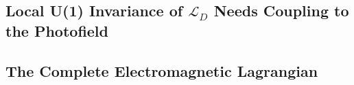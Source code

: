 \documentclass[12pt]{article}
\begin{document}
\subsection{Local U(1) Invariance of $\mathcal{L}_D$ Needs Coupling to the Photofield}

\subsection{The Complete Electromagnetic Lagrangian}

\begin{center}
\end{center}
\end{document}

